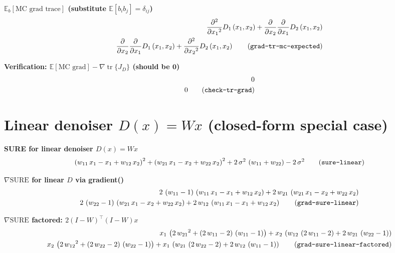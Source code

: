 \documentclass{article}
\begin{document}
\noindent\textbf{$\mathbb{E}_b[\text{MC grad trace}]$  (substitute $\mathbb{E}[b_i b_j]=\delta_{ij}$)}
\begin{align}
  \frac{\partial ^2}{\partial {x_{1}}^2} D_{1}\left(x_{1},x_{2}\right)+\frac{\partial }{\partial x_{2}} \frac{\partial }{\partial x_{1}} D_{2}\left(x_{1},x_{2}\right) \\
  \frac{\partial }{\partial x_{2}} \frac{\partial }{\partial x_{1}} D_{1}\left(x_{1},x_{2}\right)+\frac{\partial ^2}{\partial {x_{2}}^2} D_{2}\left(x_{1},x_{2}\right)
  \tag{\texttt{grad-tr-mc-expected}}
\end{align}

\noindent\textbf{Verification: $\mathbb{E}[\text{MC grad}] - \nabla\operatorname{tr}\{J_D\}$  (should be $\mathbf{0}$)}
\begin{align}
  0 \\
  0
  \tag{\texttt{check-tr-grad}}
\end{align}

\section{Linear denoiser $D(x)=Wx$ (closed-form special case)}

\noindent\textbf{SURE for linear denoiser $D(x)=Wx$}
\begin{align}
  {\left(w_{11}\,x_{1}-x_{1}+w_{12}\,x_{2}\right)}^2+{\left(w_{21}\,x_{1}-x_{2}+w_{22}\,x_{2}\right)}^2+2\,\sigma ^2\,\left(w_{11}+w_{22}\right)-2\,\sigma ^2 \tag{\texttt{sure-linear}}
\end{align}

\noindent\textbf{$\nabla\mathrm{SURE}$ for linear $D$  via gradient()}
\begin{align}
  2\,\left(w_{11}-1\right)\,\left(w_{11}\,x_{1}-x_{1}+w_{12}\,x_{2}\right)+2\,w_{21}\,\left(w_{21}\,x_{1}-x_{2}+w_{22}\,x_{2}\right) \\
  2\,\left(w_{22}-1\right)\,\left(w_{21}\,x_{1}-x_{2}+w_{22}\,x_{2}\right)+2\,w_{12}\,\left(w_{11}\,x_{1}-x_{1}+w_{12}\,x_{2}\right)
  \tag{\texttt{grad-sure-linear}}
\end{align}

\noindent\textbf{$\nabla\mathrm{SURE}$ factored: $2(I-W)^\top(I-W)x$}
\begin{align}
  x_{1}\,\left(2\,{w_{21}}^2+\left(2\,w_{11}-2\right)\,\left(w_{11}-1\right)\right)+x_{2}\,\left(w_{12}\,\left(2\,w_{11}-2\right)+2\,w_{21}\,\left(w_{22}-1\right)\right) \\
  x_{2}\,\left(2\,{w_{12}}^2+\left(2\,w_{22}-2\right)\,\left(w_{22}-1\right)\right)+x_{1}\,\left(w_{21}\,\left(2\,w_{22}-2\right)+2\,w_{12}\,\left(w_{11}-1\right)\right)
  \tag{\texttt{grad-sure-linear-factored}}
\end{align}
\end{document}

